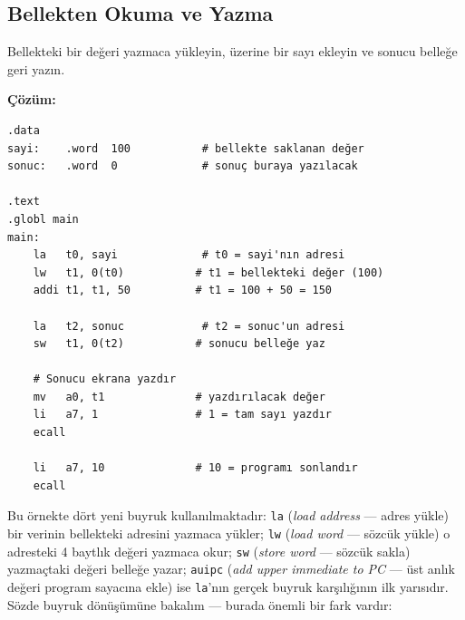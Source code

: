 \subsection{Bellekten Okuma ve Yazma}
\label{subsec:bellekten-okuma-yazma}

\begin{ornek}[4.2]
\label{orn:bellek-oku-yaz}
Bellekteki bir değeri yazmaca yükleyin, üzerine bir sayı ekleyin ve sonucu belleğe geri yazın.

\textbf{Çözüm:}

\begin{lstlisting}[style=riscv]
.data
sayi:    .word  100           # bellekte saklanan değer
sonuc:   .word  0             # sonuç buraya yazılacak

.text
.globl main
main:
    la   t0, sayi             # t0 = sayi'nın adresi
    lw   t1, 0(t0)           # t1 = bellekteki değer (100)
    addi t1, t1, 50          # t1 = 100 + 50 = 150

    la   t2, sonuc            # t2 = sonuc'un adresi
    sw   t1, 0(t2)           # sonucu belleğe yaz

    # Sonucu ekrana yazdır
    mv   a0, t1              # yazdırılacak değer
    li   a7, 1               # 1 = tam sayı yazdır
    ecall

    li   a7, 10              # 10 = programı sonlandır
    ecall
\end{lstlisting}

Bu örnekte dört yeni buyruk kullanılmaktadır: \texttt{la} (\emph{load address} --- adres yükle) bir verinin bellekteki adresini yazmaca yükler; \texttt{lw} (\emph{load word} --- sözcük yükle) o adresteki 4 baytlık değeri yazmaca okur; \texttt{sw} (\emph{store word} --- sözcük sakla) yazmaçtaki değeri belleğe yazar; \texttt{auipc} (\emph{add upper immediate to PC} --- üst anlık değeri program sayacına ekle) ise \texttt{la}'nın gerçek buyruk karşılığının ilk yarısıdır. Sözde buyruk dönüşümüne bakalım --- burada önemli bir fark vardır:


\end{ornek}
